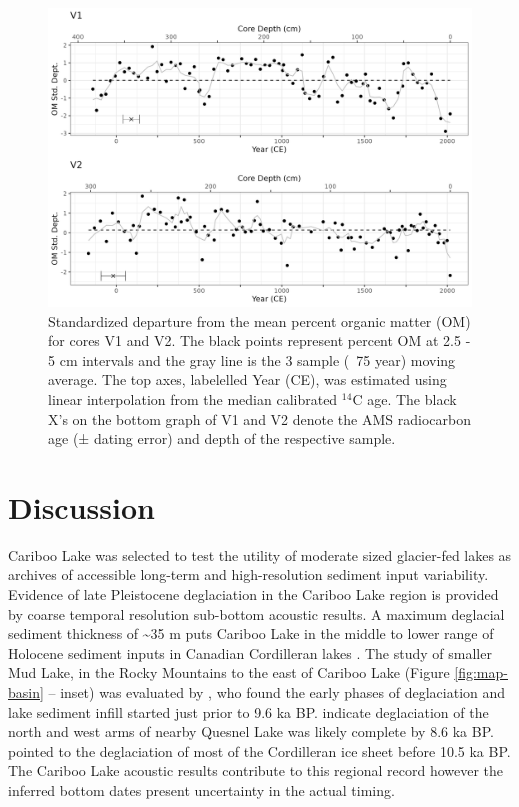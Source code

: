\documentclass[Royal,times,doublespace,sageh]{sagej}
\begin{document}
\begin{figure}

{\centering \includegraphics[width=1\linewidth]{figs/V1_V2_LOI_vs_depth_and_C14_est_yr} 

}

\caption{Standardized departure from the mean percent organic matter (OM) for cores V1 and V2. The black points represent percent OM at 2.5 - 5 cm intervals and the gray line is the 3 sample (~75 year) moving average. The top axes, labelelled Year (CE), was estimated using linear interpolation from the median calibrated $^{14}$C age. The black X's on the bottom graph of V1 and V2 denote the AMS radiocarbon age (± dating error) and depth of the respective sample.\label{loi}}\label{fig:loi}
\end{figure}

\hypertarget{discussion}{%
\section{Discussion}\label{discussion}}

Cariboo Lake was selected to test the utility of moderate sized
glacier-fed lakes as archives of accessible long-term and
high-resolution sediment input variability. Evidence of late Pleistocene
deglaciation in the Cariboo Lake region is provided by coarse temporal
resolution sub-bottom acoustic results. A maximum deglacial sediment
thickness of \textasciitilde35 m puts Cariboo Lake in the middle to
lower range of Holocene sediment inputs in Canadian Cordilleran lakes
\citep[see detailed discussion in][]{Gilbert2012}. The study of smaller
Mud Lake, in the Rocky Mountains to the east of Cariboo Lake (Figure
\ref{fig:map-basin} -- inset) was evaluated by \citet{Hodder2006b}, who
found the early phases of deglaciation and lake sediment infill started
just prior to 9.6 ka BP. \citet{Gilbert2012} indicate deglaciation of
the north and west arms of nearby Quesnel Lake was likely complete by
8.6 ka BP. \citet{Menounos2009b} pointed to the deglaciation of most of
the Cordilleran ice sheet before 10.5 ka BP. The Cariboo Lake acoustic
results contribute to this regional record however the inferred bottom
dates present uncertainty in the actual timing.
\end{document}
